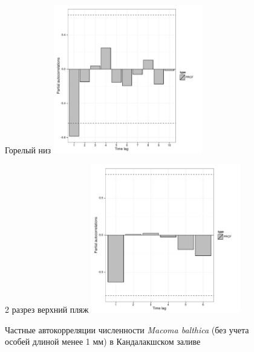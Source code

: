 \documentclass[12pt, a4paper]{disser}
\begin{document}
\begin{figure}[ht]
	\begin{minipage}[b]{.46\linewidth}
	\begin{center}
	{\tiny Горелый низ}
	\includegraphics[width=65mm]{../White_Sea/dynamic_N_N1/PRCF_Goreliy_low_.pdf}
	\end{center}
	\end{minipage}
%
	\hfil %
%
	\begin{minipage}[b]{.46\linewidth}
	\begin{center}
	{\tiny 2 разрез верхний пляж}
	\includegraphics[width=65mm]{../White_Sea/dynamic_N_N1/PRCF_razrez2_high_beatch_.pdf}
	\end{center}
	\end{minipage}

	\caption{Частные автокорреляции численности {\it Macoma balthica} (без учета особей длиной менее 1 мм) в Кандалакшском заливе}
	\label{ris:PRCF_Kandalaksha_N2}
	\end{figure}
\end{document}
